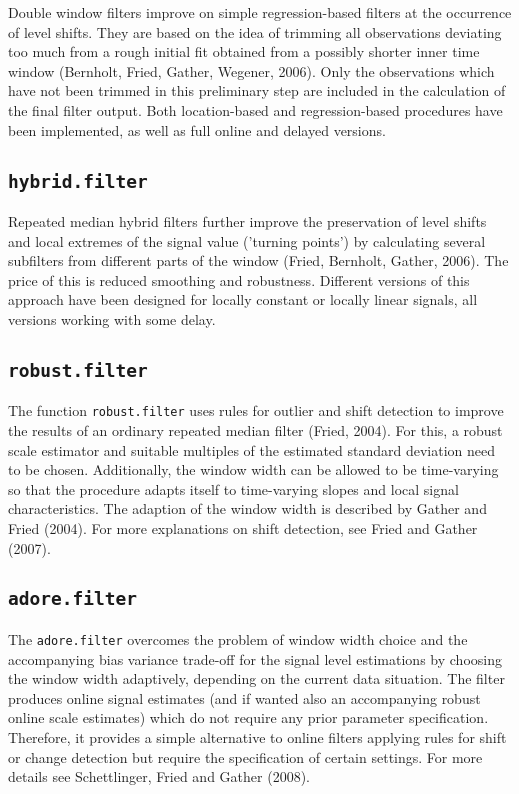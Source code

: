 \documentclass[a4paper]{scrartcl}
\begin{document}
Double window filters improve on simple regression-based filters
at the occurrence of level shifts. They are based on the idea of
trimming all observations deviating too much from a rough initial
fit obtained from a possibly shorter inner time window (Bernholt,
Fried, Gather, Wegener, 2006). Only the observations which have
not been trimmed in this preliminary step are included in the
calculation of the final filter output. Both location-based and
regression-based procedures have been implemented, as well as full
online and delayed versions.


\subsection{\texttt{hybrid.filter}}

Repeated median hybrid filters further improve the preservation of
level shifts and local extremes of the signal value ('turning
points') by calculating several subfilters from different parts of
the window (Fried, Bernholt, Gather, 2006). The price of this is
reduced smoothing and robustness. Different versions of this
approach have been designed for locally constant or locally linear
signals, all versions working with some delay.

\subsection{\texttt{robust.filter}}

The function \texttt{robust.filter} uses rules for outlier and
shift detection to improve the results of an ordinary repeated
median filter (Fried, 2004). For this, a robust scale estimator
and suitable multiples of the estimated standard deviation need to
be chosen. Additionally, the window width can be allowed to be
time-varying so that the procedure adapts itself to time-varying
slopes and local signal characteristics. The adaption of the
window width is described by Gather and Fried (2004). For more
explanations on shift detection, see Fried and Gather (2007).

\subsection{\texttt{adore.filter}}

The \texttt{adore.filter} overcomes the problem of window width choice and the accompanying bias variance trade-off for the signal level estimations by choosing the window width adaptively, depending on the current data situation. The filter produces online signal estimates (and if wanted also an accompanying robust online scale estimates) which do not require any prior parameter specification. Therefore, it provides a simple alternative to online filters applying rules for shift or change detection but require the specification of certain settings. For more details see Schettlinger, Fried and Gather (2008).
\end{document}
